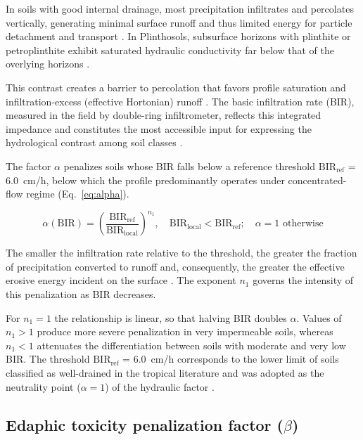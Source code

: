 \documentclass[preprint,review,12pt,authoryear]{elsarticle}
\begin{document}
In soils with good internal drainage, most precipitation infiltrates and percolates vertically, generating minimal surface runoff and thus limited energy for particle detachment and transport \citep{deroo_1992}. In Plinthosols, subsurface horizons with plinthite or petroplinthite exhibit saturated hydraulic conductivity far below that of the overlying horizons \citep{de_moraes_et_al_2006}.

This contrast creates a barrier to percolation that favors profile saturation and infiltration-excess (effective Hortonian) runoff \citep{padmanabhan_2005}. The basic infiltration rate (BIR), measured in the field by double-ring infiltrometer, reflects this integrated impedance and constitutes the most accessible input for expressing the hydrological contrast among soil classes \citep{bertoni_lombardi_neto_2017}.

The factor $\alpha$ penalizes soils whose BIR falls below a reference threshold $\mathrm{BIR_{ref}}$ = 6.0~cm/h, below which the profile predominantly operates under concentrated-flow regime (Eq.~\ref{eq:alpha}).

\begin{equation}
\alpha(\mathrm{BIR}) = \left(\frac{\mathrm{BIR_{ref}}}{\mathrm{BIR_{local}}}\right)^{n_1}, \quad \mathrm{BIR_{local}} < \mathrm{BIR_{ref}}; \quad \alpha = 1 \text{ otherwise}
\label{eq:alpha}
\end{equation}

The smaller the infiltration rate relative to the threshold, the greater the fraction of precipitation converted to runoff and, consequently, the greater the effective erosive energy incident on the surface \citep{kinnell_2005}. The exponent $n_1$ governs the intensity of this penalization as BIR decreases.

For $n_1 = 1$ the relationship is linear, so that halving BIR doubles $\alpha$. Values of $n_1 > 1$ produce more severe penalization in very impermeable soils, whereas $n_1 < 1$ attenuates the differentiation between soils with moderate and very low BIR. The threshold $\mathrm{BIR_{ref}}$ = 6.0~cm/h corresponds to the lower limit of soils classified as well-drained in the tropical literature and was adopted as the neutrality point ($\alpha = 1$) of the hydraulic factor \citep{embrapa_2018}.

\subsection{Edaphic toxicity penalization factor ($\beta$)}
\end{document}
